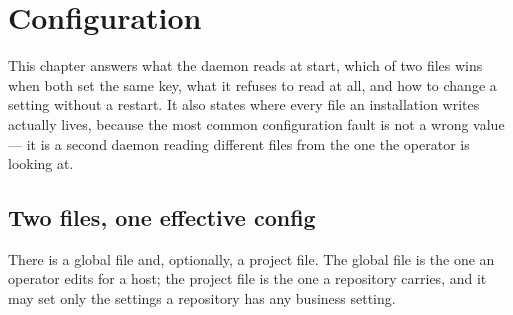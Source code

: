 \chapter{Configuration}

\label{ch:config}

This chapter answers what the daemon reads at start, which of two files wins when both set
the same key, what it refuses to read at all, and how to change a setting without a restart.
It also states where every file an installation writes actually lives, because the most
common configuration fault is not a wrong value --- it is a second daemon reading different
files from the one the operator is looking at.

\section{Two files, one effective config}

There is a global file and, optionally, a project file. The global file is the one an
operator edits for a host; the project file is the one a repository carries, and it may set
only the settings a repository has any business setting.

\begin{center}
\begin{minipage}{\linewidth}
\centering
{}
\end{minipage}
\end{center}

